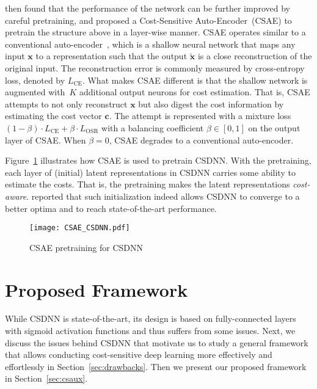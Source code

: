 \documentclass[a4paper]{article}
\begin{document}
  \cite{YC2016} then found that the performance of the network can be further improved by careful pretraining, and proposed a Cost-Sensitive Auto-Encoder~(CSAE) to pretrain the structure above in a layer-wise manner.
  CSAE operates similar to a conventional auto-encoder~\cite{bengio2009learning}, which is a shallow neural network that maps any input $\mathbf{x}$ to a representation such that the output $\tilde{\mathbf{x}}$ is a close reconstruction of the original input.
  The reconstruction error is commonly measured by cross-entropy loss, denoted by $L_{\mathrm{CE}}$.
  What makes CSAE different is that the shallow network is augmented with~$K$ additional output neurons for cost estimation.
  That is, CSAE attempts to not only reconstruct $\mathbf{x}$ but also digest the cost information by estimating the cost vector $\mathbf{c}$.
  The attempt is represented with a mixture loss $(1\!-\!\beta) \cdot L_{\mathrm{CE}} + \beta \cdot L_{\mathrm{OSR}}$ with a balancing coefficient $\beta \in [0, 1]$ on the output layer of CSAE.
  When $\beta\!=\!0$, CSAE degrades to a conventional auto-encoder.

  Figure~\ref{fig:CSAE_CSDNN} illustrates how CSAE is used to pretrain CSDNN.
  With the pretraining, each layer of (initial) latent representations in CSDNN carries some ability to estimate the costs.
  That is, the pretraining makes the latent representations \textit{cost-aware}.
  \cite{YC2016} reported that such initialization indeed allows CSDNN to converge to a better optima and to reach state-of-the-art performance.

  \begin{figure}
    \centering
    \texttt{[image: CSAE\_CSDNN.pdf]}
    \caption{
      CSAE pretraining for CSDNN~\cite{YC2016}
    }
    \label{fig:CSAE_CSDNN}
  \end{figure}



\section{Proposed Framework}
\label{sec:model}
  While CSDNN is state-of-the-art, its design is based on fully-connected layers with sigmoid activation functions and thus suffers from some issues. Next, we discuss the issues behind CSDNN that motivate us 
  to study a general framework that allows conducting cost-sensitive deep learning more effectively and effortlessly in Section~\ref{sec:drawbacks}.
  Then we present our proposed framework in Section~\ref{sec:csaux}.
\end{document}
